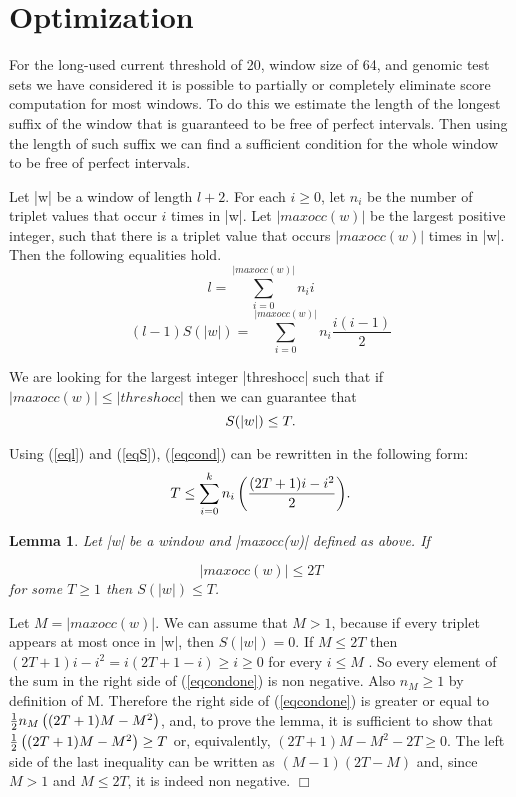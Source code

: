 \documentclass{article}
\newtheorem{lemma}{Lemma}
\begin{document}
\section{Optimization}

For the long-used current threshold of 20, window size of 64, and genomic test 
sets we have considered it is possible to partially or completely eliminate 
score computation for most windows.  To do this we estimate the length of the 
longest suffix of the window that is guaranteed to be free of perfect intervals. 
Then using the length of such suffix we can find a sufficient condition for the 
whole window to be free of perfect intervals.

Let |w| be a window of length $l+2$. For each $i \ge 0$, let $n_i$ be the number 
of triplet values that occur $i$ times in |w|. Let $|maxocc(w)|$ be the largest positive 
integer, such that there is a triplet value that occurs $|maxocc(w)|$ times in |w|.  Then 
the following equalities hold.
\begin{equation}\label{eql}
l = \sum_{i=0}^{|maxocc(w)|}{n_ii}
\end{equation}
\begin{equation}\label{eqS}
(l-1)S(|w|) = \sum_{i=0}^{|maxocc(w)|}{n_i\frac{i(i-1)}{2}}
\end{equation}

We are looking for the largest integer |threshocc| such that if $|maxocc(w)| \le |threshocc|$
then we can guarantee that
\begin{equation}\label{eqcond}
S(|w|) \le T{\rm.}
\end{equation}

Using (\ref{eql}) and (\ref{eqS}), (\ref{eqcond}) can be rewritten in the following
form:
\begin{equation}\label{eqcondone}
T \le \sum_{i=0}^k{n_i\left(\frac{(2T+1)i - i^2}{2}\right)}{\rm .}
\end{equation}

\begin{lemma}\label{lemmaone}
Let |w| be a window and |maxocc(w)| defined as above. If 

\begin{equation}\label{eqsuff}
|maxocc(w)| \le 2T
\end{equation}
for some $T \ge 1$ then $S(|w|) \le T$.
\end{lemma}

\proof Let $M = |maxocc(w)|$. We can assume that $M > 1$, because if every triplet appears at most once 
in |w|, then $S(|w|) = 0$. If $M \le 2T$ then 
$(2T + 1)i - i^2 = i( 2T + 1 - i ) \ge i \ge 0$ for every $i \le M$ . So every
element of the sum in the right side of (\ref{eqcondone}) is non negative.
Also $n_M \ge 1$ by definition of M. Therefore the right side of 
(\ref{eqcondone}) is greater or equal to 
${1\over2}n_M\left((2T + 1)M - M^2\right)$, and, to prove the lemma, it is 
sufficient to show that ${1\over2}\left((2T + 1)M - M^2\right) \ge T$ or,
equivalently, $(2T + 1)M - M^2 - 2T \ge 0$. The left side of the last inequality
can be written as $(M - 1)(2T - M)$ and, since $M > 1$ and $M \le 2T$, it is
indeed non negative. $\Box$
\end{document}
